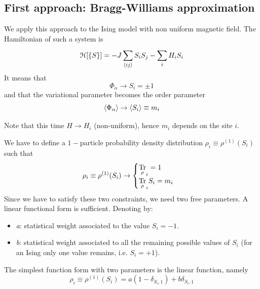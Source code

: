 \documentclass[../../Main/Main.tex]{subfiles}
\begin{document}
\subsection{First approach: Bragg-Williams approximation}
We apply this approach to the Ising model with non uniform magnetic field. The Hamiltonian of such a system is 
\begin{equation}
  \mathcal{H} [\{ S \}  ] = - J \sum_{\expval{ij} }^{} S_i S_j - \sum_{i}^{} H_i S_i
\end{equation}
It means that
\begin{equation*}
  \Phi _ \alpha \rightarrow S_i = \pm 1
\end{equation*}
and that the variational parameter becomes the order parameter
\begin{equation*}
  \expval{\Phi _ \alpha } \rightarrow \expval{S_i}  \equiv m_i
\end{equation*}
\begin{remark}
Note that this time \( H \rightarrow H_i \) (non-uniform), hence \( m_i \) depends on the site \( i \).
\end{remark}
We have to define a \( 1- \)particle probability density distribution \( \rho _i \equiv \rho ^{(1)} (S_i) \) such that
\begin{equation}
  \rho_i \equiv \rho ^{(1)} (S_i) \rightarrow \begin{cases}
    \underset{\rho}{\text{Tr}} _i  = 1 \\
    \underset{\rho}{\text{Tr}} _i  S_i = m_i
\end{cases}
\end{equation}
Since we have to satisfy these two constraints, we need two free parameters. A linear functional form is sufficient. Denoting by:
\begin{itemize}
\item \emph{a}: statistical weight associated to the value \( S_i =-1\).
\item \emph{b}: statistical weight associated to all the remaining possible values of \( S_i \) (for an Ising only one value remains, i.e. \( S_i = +1 \)).
\end{itemize}
The simplest function form with two parameters is the linear function, namely
\begin{equation}
  \rho _i \equiv \rho^{(1)} (S_i) = a (1- \delta _{S_i,1}) + b \delta _{S_i,1}
\end{equation}
\end{document}
